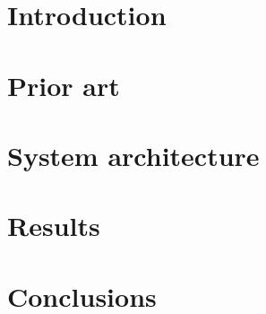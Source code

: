 \documentclass[oneside]{ctuthesis}
\theoremstyle{plain}
\theoremstyle{definition}
\theoremstyle{note}
\begin{document}
\maketitle


\chapter{\label{chapter:introduction} Introduction}


\chapter{\label{chapter:prior} Prior art}


\chapter{\label{chapter:architecture} System architecture}


\chapter{\label{chapter:results} Results}



\chapter{Conclusions}


\printindex





\end{document}
